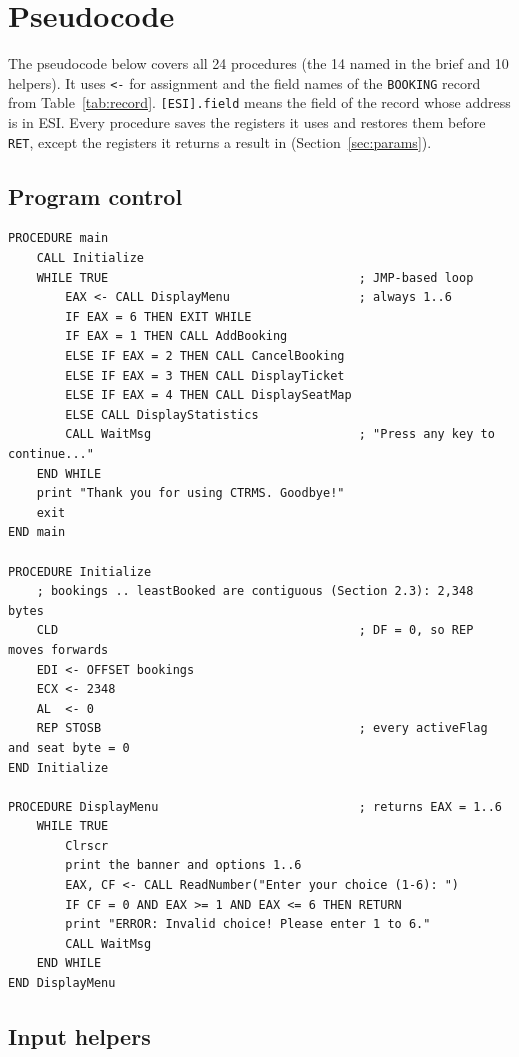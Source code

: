 \documentclass{thesis-library}
\begin{document}
\section{Pseudocode}

The pseudocode below covers all 24 procedures (the 14 named in the brief and 10 helpers). It uses \texttt{<-} for assignment and the field names of the \texttt{BOOKING} record from Table~\ref{tab:record}. \texttt{[ESI].field} means the field of the record whose address is in ESI. Every procedure saves the registers it uses and restores them before \texttt{RET}, except the registers it returns a result in (Section~\ref{sec:params}).

\subsection{Program control}

\begin{lstlisting}
PROCEDURE main
    CALL Initialize
    WHILE TRUE                                   ; JMP-based loop
        EAX <- CALL DisplayMenu                  ; always 1..6
        IF EAX = 6 THEN EXIT WHILE
        IF EAX = 1 THEN CALL AddBooking
        ELSE IF EAX = 2 THEN CALL CancelBooking
        ELSE IF EAX = 3 THEN CALL DisplayTicket
        ELSE IF EAX = 4 THEN CALL DisplaySeatMap
        ELSE CALL DisplayStatistics
        CALL WaitMsg                             ; "Press any key to continue..."
    END WHILE
    print "Thank you for using CTRMS. Goodbye!"
    exit
END main

PROCEDURE Initialize
    ; bookings .. leastBooked are contiguous (Section 2.3): 2,348 bytes
    CLD                                          ; DF = 0, so REP moves forwards
    EDI <- OFFSET bookings
    ECX <- 2348
    AL  <- 0
    REP STOSB                                    ; every activeFlag and seat byte = 0
END Initialize

PROCEDURE DisplayMenu                            ; returns EAX = 1..6
    WHILE TRUE
        Clrscr
        print the banner and options 1..6
        EAX, CF <- CALL ReadNumber("Enter your choice (1-6): ")
        IF CF = 0 AND EAX >= 1 AND EAX <= 6 THEN RETURN
        print "ERROR: Invalid choice! Please enter 1 to 6."
        CALL WaitMsg
    END WHILE
END DisplayMenu
\end{lstlisting}

\subsection{Input helpers}
\end{document}
